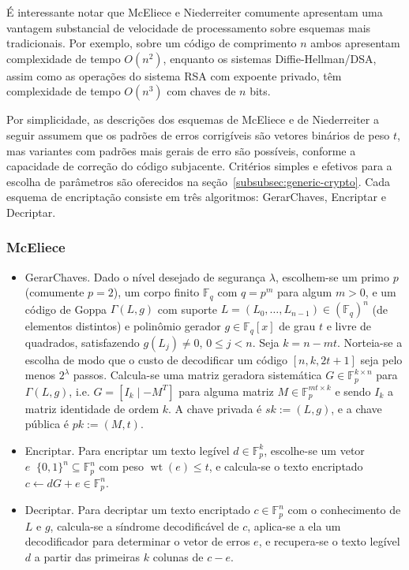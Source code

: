 \documentclass{SBCbookchapter}
\newcommand{\F}{\mathbb{F}}
\newcommand{\samples}{\mathop{\stackrel{\ _\$}{\gets}}}
\DeclareMathOperator{\wt}{wt}
\begin{document}
\begin{otherlanguage}{brazilian}
É interessante notar que McEliece e Niederreiter comumente apresentam uma vantagem substancial de velocidade de processamento sobre esquemas mais tradicionais. Por exemplo, sobre um código de comprimento $n$ ambos apresentam complexidade de tempo $O(n^2)$, enquanto os sistemas Diffie-Hellman/DSA, assim como as operações do sistema RSA com expoente privado, têm complexidade de tempo $O(n^3)$ com chaves de $n$ bits.

Por simplicidade, as descrições dos esquemas de McEliece e de Niederreiter a seguir assumem que os padrões de erros corrigíveis são vetores binários de peso $t$, mas variantes com padrões mais gerais de erro são possíveis, conforme a capacidade de correção do código subjacente.
Critérios simples e efetivos para a escolha de parâmetros são oferecidos na seção~\ref{subsubsec:generic-crypto}.
Cada esquema de encriptação consiste em três algoritmos: \textsf{GerarChaves}, \textsf{Encriptar} e \textsf{Decriptar}.

\subsubsection{McEliece}\label{subsubsec:mceliece}

\begin{itemize}
\item \textsf{GerarChaves}. Dado o nível desejado de segurança $\lambda$, escolhem-se um primo $p$ (comumente $p = 2$), um corpo finito $\F_{q}$ com $q = p^m$ para algum $m > 0$, e um código de Goppa $\Gamma(L, g)$ com suporte $L = (L_0, \dots, L_{n-1}) \in (\F_{q})^n$ (de elementos distintos) e polinômio gerador $g \in \F_{q}[x]$ de grau $t$ e livre de quadrados, satisfazendo $g(L_j) \neq 0$, $0 \leqslant j < n$. Seja $k = n - mt$. Norteia-se a escolha de modo que o custo de decodificar um código $[n, k, 2t + 1]$ seja pelo menos $2^\lambda$ passos.
Calcula-se uma matriz geradora sistemática $G \in \F_p^{k \times n}$ para $\Gamma(L, g)$, i.e. $G = [I_k \mid -M^T]$ para alguma matriz $M \in \F_p^{mt \times k}$ e sendo $I_{k}$ a matriz identidade de ordem $k$. A chave privada é $sk := (L, g)$, e a chave pública é $pk := (M, t)$.

\item \textsf{Encriptar}. Para encriptar um texto legível $d \in \F_p^k$, escolhe-se um vetor $e \samples \{0, 1\}^n \subseteq \F_p^n$ com peso $\wt(e) \leqslant t$, e calcula-se o texto encriptado $c \gets dG + e \in \F_p^n$.

\item \textsf{Decriptar}. Para decriptar um texto encriptado $c \in \F_p^n$ com o conhecimento de $L$ e $g$, calcula-se a síndrome decodificável de $c$, aplica-se a ela um decodificador para determinar o vetor de erros $e$, e recupera-se o texto legível $d$ a partir das primeiras $k$ colunas de $c - e$.
\end{itemize}


\end{otherlanguage}
\end{document}
